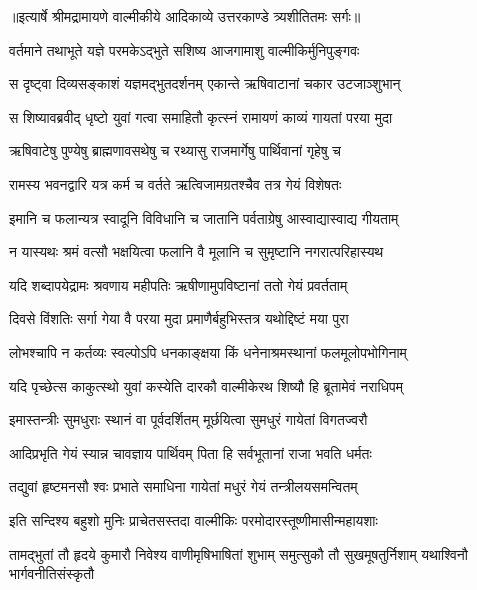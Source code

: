 {॥इत्यार्षे श्रीमद्रामायणे वाल्मीकीये आदिकाव्ये उत्तरकाण्डे त्र्यशीतितमः सर्गः॥}


\twolineshloka
{वर्तमाने तथाभूते यज्ञे परमकेऽद्भुते}
{सशिष्य आजगामाशु वाल्मीकिर्मुनिपुङ्गवः} %

\twolineshloka
{स दृष्ट्वा दिव्यसङ्काशं यज्ञमद्भुतदर्शनम्}
{एकान्ते ऋषिवाटानां चकार उटजाञ्शुभान्} %

\twolineshloka
{स शिष्यावब्रवीद् धृष्टो युवां गत्वा समाहितौ}
{कृत्स्नं रामायणं काव्यं गायतां परया मुदा} %

\twolineshloka
{ऋषिवाटेषु पुण्येषु ब्राह्मणावसथेषु च}
{रथ्यासु राजमार्गेषु पार्थिवानां गृहेषु च} %

\twolineshloka
{रामस्य भवनद्वारि यत्र कर्म च वर्तते}
{ऋत्विजामग्रतश्चैव तत्र गेयं विशेषतः} %

\twolineshloka
{इमानि च फलान्यत्र स्वादूनि विविधानि च}
{जातानि पर्वताग्रेषु आस्वाद्यास्वाद्य गीयताम्} %

\twolineshloka
{न यास्यथः श्रमं वत्सौ भक्षयित्वा फलानि वै}
{मूलानि च सुमृष्टानि नगरात्परिहास्यथ} %

\twolineshloka
{यदि शब्दापयेद्रामः श्रवणाय महीपतिः}
{ऋषीणामुपविष्टानां ततो गेयं प्रवर्तताम्} %

\twolineshloka
{दिवसे विंशतिः सर्गा गेया वै परया मुदा}
{प्रमाणैर्बहुभिस्तत्र यथोद्दिष्टं मया पुरा} %

\twolineshloka
{लोभश्चापि न कर्तव्यः स्वल्पोऽपि धनकाङ्क्षया}
{किं धनेनाश्रमस्थानां फलमूलोपभोगिनाम्} %

\twolineshloka
{यदि पृच्छेत्स काकुत्स्थो युवां कस्येति दारकौ}
{वाल्मीकेरथ शिष्यौ हि ब्रूतामेवं नराधिपम्} %

\twolineshloka
{इमास्तन्त्रीः सुमधुराः स्थानं वा पूर्वदर्शितम्}
{मूर्छयित्वा सुमधुरं गायेतां विगतज्वरौ} %

\twolineshloka
{आदिप्रभृति गेयं स्यान्न चावज्ञाय पार्थिवम्}
{पिता हि सर्वभूतानां राजा भवति धर्मतः} %

\twolineshloka
{तद्युवां हृष्टमनसौ श्वः प्रभाते समाधिना}
{गायेतां मधुरं गेयं तन्त्रीलयसमन्वितम्} %

\twolineshloka
{इति सन्दिश्य बहुशो मुनिः प्राचेतसस्तदा}
{वाल्मीकिः परमोदारस्तूष्णीमासीन्महायशाः} %

\fourlineindentedshloka
{तामद्भुतां तौ हृदये कुमारौ}
{निवेश्य वाणीमृषिभाषितां शुभाम्}
{समुत्सुकौ तौ सुखमूषतुर्निशाम्}
{यथाश्विनौ भार्गवनीतिसंस्कृतौ} %


